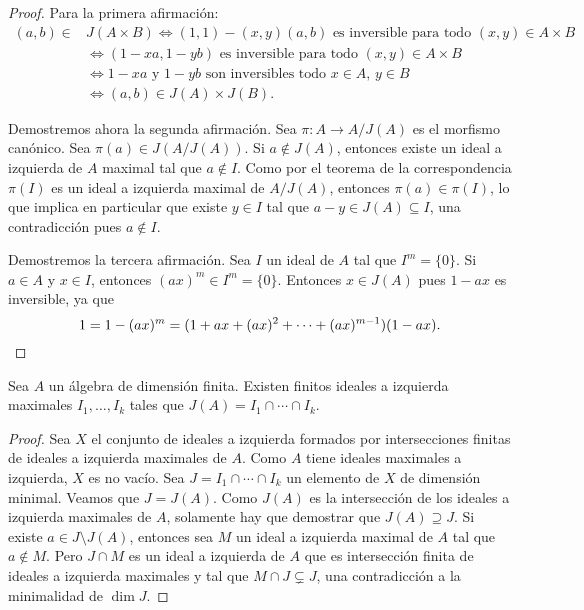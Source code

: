 \begin{proof}
Para la primera afirmación:
\begin{align*}
(a,b)\in &J(A\times B)
\Longleftrightarrow
(1,1)-(x,y)(a,b)\text{ es inversible para todo $(x,y)\in A\times B$}\\
&\Longleftrightarrow   
(1-xa,1-yb)\text{ es inversible para 
todo $(x,y)\in A\times B$}\\
&\Longleftrightarrow 
1-xa\text{ y } 
1-yb\text{ son inversibles todo $x\in A$, $y\in B$}\\
&\Longleftrightarrow (a,b)\in J(A)\times J(B).
\end{align*}

Demostremos ahora la segunda afirmación. Sea $\pi\colon A\to A/J(A)$ es el morfismo canónico. 
Sea $\pi(a)\in J(A/J(A))$. Si $a\not\in J(A)$, entonces
existe un ideal a izquierda de $A$ maximal tal que $a\not\in I$. Como por el teorema de la correspondencia 
$\pi(I)$ es un ideal a izquierda
maximal de $A/J(A)$, entonces $\pi(a)\in\pi(I)$, lo que implica en particular 
que existe $y\in I$ tal que
$a-y\in J(A)\subseteq I$, una contradicción pues $a\not\in I$.  

Demostremos la tercera afirmación. Sea $I$ un ideal de $A$ 
tal que $I^m=\{0\}$. Si $a\in A$ y $x\in I$, entonces
$(ax)^m\in I^m=\{0\}$. Entonces $x\in J(A)$ pues $1-ax$ es inversible, ya que 
\[
1=1-(ax)^m=(1+ax+(ax)^2+\cdots+(ax)^{m-1})(1-ax)\qedhere.
\]
\end{proof}

\begin{lemma}
Sea $A$ un álgebra de dimensión finita. Existen finitos ideales a izquierda maximales
$I_1,\dots,I_k$ tales que $J(A)=I_1\cap\cdots \cap I_k$.
\end{lemma}

\begin{proof}
Sea $X$ el conjunto de ideales a izquierda 
formados por intersecciones finitas de ideales a izquierda maximales de $A$. 
Como $A$ tiene ideales maximales a izquierda, $X$ es no vacío. Sea $J=I_1\cap\cdots\cap I_k$ 
un elemento de $X$ de dimensión minimal. Veamos que $J=J(A)$. Como $J(A)$ es la intersección
de los ideales a izquierda maximales de $A$, solamente hay que demostrar que $J(A)\supseteq J$. Si existe
$a\in J\setminus J(A)$, entonces sea $M$ un ideal a izquierda maximal de $A$ tal que 
$a\not\in M$. Pero $J\cap M$ es un ideal a izquierda de $A$ que es intersección 
finita de ideales a izquierda maximales  
y tal que $M\cap J\subsetneq J$, una contradicción a la minimalidad de $\dim J$. 
\end{proof}

